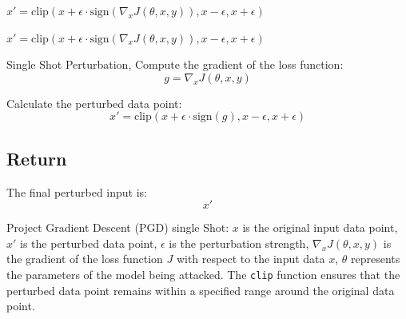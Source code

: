 
$x' = \text{clip}(x + \epsilon \cdot \text{sign}(\nabla_x J(\theta, x, y)), x - \epsilon, x + \epsilon)$



$x' = \text{clip}(x + \epsilon \cdot \text{sign}(\nabla_x J(\theta, x, y)), x - \epsilon, x + \epsilon)$

Single Shot Perturbation, Compute the gradient of the loss function:
\[
g = \nabla_x J(\theta, x, y)
\]

Calculate the perturbed data point:
\[
x' = \text{clip}(x + \epsilon \cdot \text{sign}(g), x - \epsilon, x + \epsilon)
\]

\subsection*{Return}
The final perturbed input is:
\[
x'
\]

Project Gradient Descent (PGD) single Shot:
$x$ is the original input data point,
$x'$ is the perturbed data point,
$\epsilon$ is the perturbation strength,
$\nabla_x J(\theta, x, y)$ is the gradient of the loss function $J$ with respect to the input data $x$,
$\theta$ represents the parameters of the model being attacked.
The \texttt{clip} function ensures that the perturbed data point remains within a specified range around the original data point.